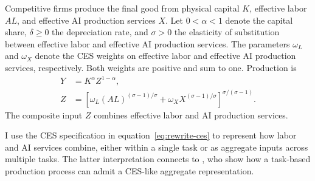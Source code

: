 Competitive firms produce the final good from physical capital $K$, effective labor $AL$, and effective AI production services $X$. Let $0<\alpha<1$ denote the capital share, $\delta\geq0$ the depreciation rate, and $\sigma>0$ the elasticity of substitution between effective labor and effective AI production services. The parameters $\omega_L$ and $\omega_X$ denote the CES weights on effective labor and effective AI production services, respectively. Both weights are positive and sum to one. Production is
\begin{align}
 Y&=K^\alpha Z^{1-\alpha},
 \label{eq:rewrite-output}\\
 Z&=\left[\omega_L(AL)^{(\sigma-1)/\sigma}
 +\omega_XX^{(\sigma-1)/\sigma}\right]^{
 \sigma/(\sigma-1)}.
 \label{eq:rewrite-ces}
\end{align}
The composite input $Z$ combines effective labor and AI production services.


I use the CES specification in equation~\eqref{eq:rewrite-ces} to
represent how labor and AI services combine, either within a single
task or as aggregate inputs across multiple tasks. The latter
interpretation connects to \citet{jonestonetti2026}, who show how a
task-based production process can admit a CES-like aggregate
representation.


